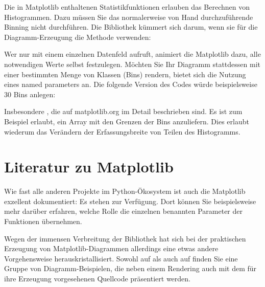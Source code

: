 Die in Matplotlib enthaltenen Statistikfunktionen erlauben das Berechnen von Histogrammen. Dazu müssen Sie das normalerweise von Hand durchzuführende Binning nicht durchführen. Die Bibliothek kümmert sich darum, wenn sie für die Diagramm-Erzeugung die Methode  verwenden:

\medskip




\medskip

Wer  nur mit einem einzelnen Datenfeld aufruft, animiert die Matplotlib dazu, alle notwendigen Werte selbst festzulegen. Möchten Sie Ihr Diagramm stattdessen mit einer bestimmten Menge von Klassen (Bins) rendern, bietet sich die Nutzung eines named parameters an. Die folgende Version des Codes würde beispielsweise 30 Bins anlegen:

\medskip




\medskip

Insbesondere , die auf matplotlib.org im Detail beschrieben sind. Es ist zum Beispiel erlaubt, ein Array mit den Grenzen der Bins anzuliefern. Dies erlaubt wiederum das Verändern der Erfassungsbreite von Teilen des Histogramms.

\Ausblenden{

} %


\section{Literatur zu Matplotlib}

Wie fast alle anderen Projekte im Python-Ökosystem ist auch die Matplotlib exzellent dokumentiert: Es stehen  zur Verfügung. Dort können Sie beispielsweise mehr darüber erfahren, welche Rolle die einzelnen benannten Parameter der Funktionen übernehmen.

Wegen der immensen Verbreitung der Bibliothek hat sich bei der praktischen Erzeugung von Matplotlib-Diagrammen allerdings eine etwas andere Vorgehensweise herauskristallisiert. Sowohl auf  als auch auf  finden Sie eine Gruppe von Diagramm-Beispielen, die neben einem Rendering auch mit dem für ihre Erzeugung vorgesehenen Quellcode präsentiert werden.

